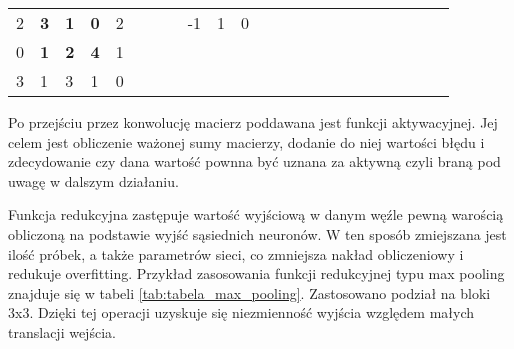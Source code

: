 \begin{table}[h]
{\begin{tabular}{lllllllllllllllllllllll}
\multicolumn{1}{|l|}{2} & \multicolumn{1}{l|}{\textbf{3}} & \multicolumn{1}{l|}{\textbf{1}} & \multicolumn{1}{l|}{\textbf{0}} & \multicolumn{1}{l|}{2} &  &  & \multicolumn{1}{l|}{} & \multicolumn{1}{l|}{-1} & \multicolumn{1}{l|}{1}  & \multicolumn{1}{l|}{0}  &  &  &                       &                         &                        &  &  &                       &                        &                         &  &  \\ \cline{1-5} \cline{9-11}
\multicolumn{1}{|l|}{0} & \multicolumn{1}{l|}{\textbf{1}} & \multicolumn{1}{l|}{\textbf{2}} & \multicolumn{1}{l|}{\textbf{4}} & \multicolumn{1}{l|}{1} &  &  &                       &                         &                         &                         &  &  &                       &                         &                        &  &  &                       &                        &                         &  &  \\ \cline{1-5}
\multicolumn{1}{|l|}{3} & \multicolumn{1}{l|}{1}          & \multicolumn{1}{l|}{3}          & \multicolumn{1}{l|}{1}          & \multicolumn{1}{l|}{0} &  &  &                       &                         &                         &                         &  &  &                       &                         &                        &  &  &                       &                        &                         &  &  \\ \cline{1-5}
\end{tabular}%
}
\label{tab:tabela_filtry_konwolucyjne}
\end{table}

Po przejściu przez konwolucję macierz poddawana jest funkcji aktywacyjnej. Jej celem jest obliczenie ważonej sumy macierzy, dodanie do niej wartości błędu i zdecydowanie czy dana wartość pownna być uznana za aktywną czyli braną pod uwagę w dalszym działaniu.

Funkcja redukcyjna zastępuje wartość wyjściową w danym węźle pewną warością obliczoną na podstawie wyjść sąsiednich neuronów. W ten sposób zmiejszana jest ilość próbek, a także parametrów sieci, co zmniejsza nakład obliczeniowy i redukuje overfitting. Przykład zasosowania funkcji redukcyjnej typu max pooling znajduje się w tabeli \ref{tab:tabela_max_pooling}. Zastosowano podział na bloki 3x3. Dzięki tej operacji uzyskuje się niezmienność wyjścia względem małych translacji wejścia.


